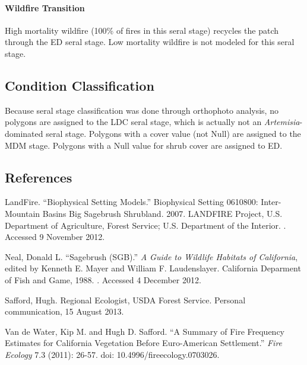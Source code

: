\paragraph{Wildfire Transition} High mortality wildfire (100\% of fires in this seral stage) recycles the patch through the ED seral stage. Low mortality wildfire is not modeled for this seral stage.

\noindent\hrulefill

\subsection*{Condition Classification}
Because seral stage classification was done through orthophoto analysis, no polygons are assigned to the LDC seral stage, which is actually not an \emph{Artemisia}-dominated seral stage. Polygons with a cover value (not Null) are assigned to the MDM stage. Polygons with a Null value for shrub cover are assigned to ED.



\subsection*{References}

\begin{hangparas}{.25in}{1} 
LandFire. ``Biophysical Setting Models.'' Biophysical Setting 0610800: Inter-Mountain Basins Big Sagebrush Shrubland. 2007. LANDFIRE Project, U.S. Department of Agriculture, Forest Service; U.S. Department of the Interior. . Accessed 9 November 2012.

Neal, Donald L. ``Sagebrush (SGB).'' \emph{A Guide to Wildlife Habitats of California}, edited by Kenneth E. Mayer and William F. Laudenslayer. California Deparment of Fish and Game, 1988. . Accessed 4 December 2012.

Safford, Hugh. Regional Ecologist, USDA Forest Service. Personal communication, 15 August 2013.

Van de Water, Kip M. and Hugh D. Safford. ``A Summary of Fire Frequency Estimates for California Vegetation Before Euro-American Settlement.'' \emph{Fire Ecology} 7.3 (2011): 26-57. doi: 10.4996/fireecology.0703026.
\end{hangparas}

